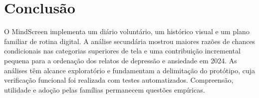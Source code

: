 ﻿\documentclass[12pt]{article}
\begin{document}
\section{Conclusão}
O MindScreen implementa um diário voluntário, um histórico visual e um plano familiar de rotina digital. A análise secundária mostrou maiores razões de chances condicionais nas categorias superiores de tela e uma contribuição incremental pequena para a ordenação dos relatos de depressão e ansiedade em 2024. As análises têm alcance exploratório e fundamentam a delimitação do protótipo, cuja verificação funcional foi realizada com testes automatizados. Compreensão, utilidade e adoção pelas famílias permanecem questões empíricas.



\end{document}
